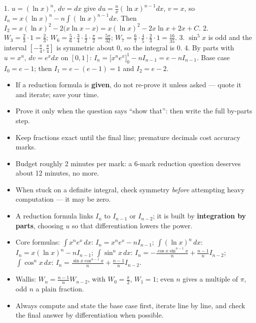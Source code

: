 \documentclass[11pt]{article}
\begin{document}
\begin{corrige}[Exercise 1]
1. $u=(\ln x)^n$, $dv=dx$ give $du=\frac{n}{x}(\ln x)^{n-1}dx$, $v=x$, so $I_n = x(\ln x)^n - n\int(\ln x)^{n-1}dx$. Then $I_2 = x(\ln x)^2 - 2\big(x\ln x - x\big) = x(\ln x)^2 - 2x\ln x + 2x + C$.
2. $W_3=\frac{2}{3}\cdot 1=\frac{2}{3}$; $W_6=\frac{5}{6}\cdot\frac{3}{4}\cdot\frac{1}{2}\cdot\frac{\pi}{2}=\frac{5\pi}{32}$; $W_7=\frac{6}{7}\cdot\frac{4}{5}\cdot\frac{2}{3}\cdot 1=\frac{16}{35}$.
3. $\sin^5 x$ is odd and the interval $[-\frac{\pi}{4},\frac{\pi}{4}]$ is symmetric about $0$, so the integral is $0$.
4. By parts with $u=x^n$, $dv=e^x dx$ on $[0,1]$: $I_n = \big[x^n e^x\big]_0^1 - nI_{n-1} = e - nI_{n-1}$. Base case $I_0 = e-1$; then $I_1 = e - (e-1) = 1$ and $I_2 = e - 2$.
\end{corrige}

\begin{attention}
\begin{itemize}
\item If a reduction formula is \textbf{given}, do not re-prove it unless asked — quote it and iterate; save your time.
\item Prove it only when the question says ``show that'': then write the full by-parts step.
\item Keep fractions exact until the final line; premature decimals cost accuracy marks.
\item Budget roughly 2 minutes per mark: a 6-mark reduction question deserves about 12 minutes, no more.
\item When stuck on a definite integral, check symmetry \emph{before} attempting heavy computation — it may be zero.
\end{itemize}
\end{attention}

\begin{aretenir}
\begin{itemize}
\item A reduction formula links $I_n$ to $I_{n-1}$ or $I_{n-2}$; it is built by \textbf{integration by parts}, choosing $u$ so that differentiation lowers the power.
\item Core formulas: $\int x^n e^x\,dx$: $I_n = x^n e^x - nI_{n-1}$; $\int(\ln x)^n\,dx$: $I_n = x(\ln x)^n - nI_{n-1}$; $\int\sin^n x\,dx$: $I_n = -\frac{\cos x\sin^{n-1}x}{n}+\frac{n-1}{n}I_{n-2}$; $\int\cos^n x\,dx$: $I_n = \frac{\sin x\cos^{n-1}x}{n}+\frac{n-1}{n}I_{n-2}$.
\item Wallis: $W_n=\frac{n-1}{n}W_{n-2}$, with $W_0=\frac{\pi}{2}$, $W_1=1$; even $n$ gives a multiple of $\pi$, odd $n$ a plain fraction.
\item Always compute and state the base case first, iterate line by line, and check the final answer by differentiation when possible.
\end{itemize}
\end{aretenir}
\end{document}
